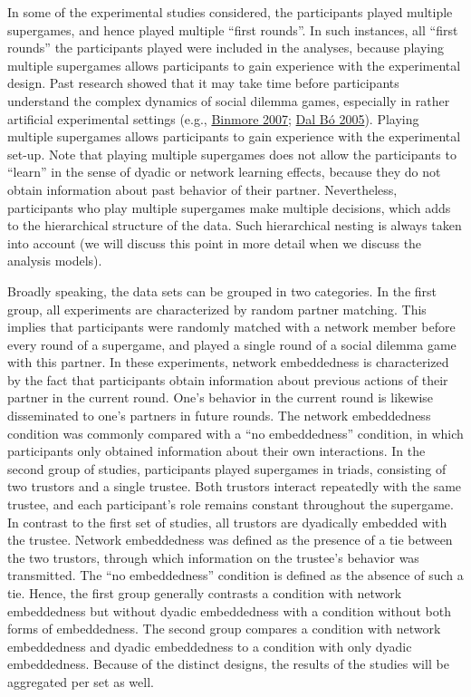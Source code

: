 \documentclass[
  11pt,
]{article}
\begin{document}
In some of the experimental studies considered, the participants played multiple supergames, and hence played multiple ``first rounds''.
In such instances, all ``first rounds'' the participants played were included in the analyses, because playing multiple supergames allows participants to gain experience with the experimental design.
Past research showed that it may take time before participants understand the complex dynamics of social dilemma games, especially in rather artificial experimental settings (e.g., \protect\hyperlink{ref-binmore_playing_2007}{Binmore 2007}; \protect\hyperlink{ref-dal_buxf3_cooperation_2005}{Dal Bó 2005}).
Playing multiple supergames allows participants to gain experience with the experimental set-up.
Note that playing multiple supergames does not allow the participants to ``learn'' in the sense of dyadic or network learning effects, because they do not obtain information about past behavior of their partner.
Nevertheless, participants who play multiple supergames make multiple decisions, which adds to the hierarchical structure of the data.
Such hierarchical nesting is always taken into account (we will discuss this point in more detail when we discuss the analysis models).

Broadly speaking, the data sets can be grouped in two categories.
In the first group, all experiments are characterized by random partner matching.
This implies that participants were randomly matched with a network member before every round of a supergame, and played a single round of a social dilemma game with this partner.
In these experiments, network embeddedness is characterized by the fact that participants obtain information about previous actions of their partner in the current round.
One's behavior in the current round is likewise disseminated to one's partners in future rounds.
The network embeddedness condition was commonly compared with a ``no embeddedness'' condition, in which participants only obtained information about their own interactions.
In the second group of studies, participants played supergames in triads, consisting of two trustors and a single trustee.
Both trustors interact repeatedly with the same trustee, and each participant's role remains constant throughout the supergame.
In contrast to the first set of studies, all trustors are dyadically embedded with the trustee.
Network embeddedness was defined as the presence of a tie between the two trustors, through which information on the trustee's behavior was transmitted.
The ``no embeddedness'' condition is defined as the absence of such a tie.
Hence, the first group generally contrasts a condition with network embeddedness but without dyadic embeddedness with a condition without both forms of embeddedness.
The second group compares a condition with network embeddedness and dyadic embeddedness to a condition with only dyadic embeddedness.
Because of the distinct designs, the results of the studies will be aggregated per set as well.
\end{document}
